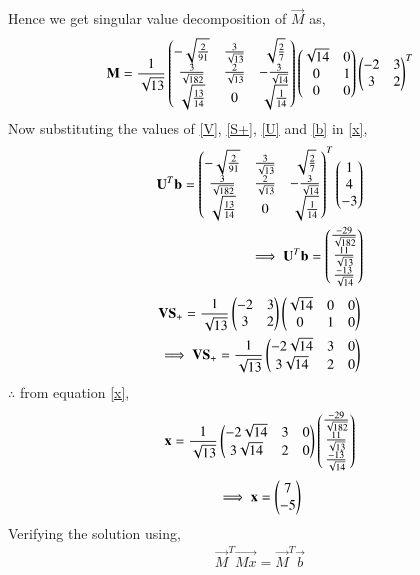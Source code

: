 \documentclass[journal,12pt,twocolumn]{IEEEtran}
\begin{document}
Hence we get singular value decomposition of $\vec{M}$ as,
\begin{align}
\mathbf{M} = \frac{1}{\sqrt{13}}\begin{pmatrix}-\sqrt{\frac{2}{91}} &\frac{3}{\sqrt{13}} & \sqrt{\frac{2}{7}}\\\frac{3}{\sqrt{182}} &\frac{2}{\sqrt{13}} &-\frac{3}{\sqrt{14}} \\\sqrt{\frac{13}{14}} &0 & \sqrt{\frac{1}{14}}\end{pmatrix}\begin{pmatrix}\sqrt{14}&0\\0&1\\0&0\end{pmatrix}\begin{pmatrix}-2&3\\3&2\end{pmatrix}^T
\end{align}
Now substituting the values of \eqref{V}, \eqref{S+}, \eqref{U} and \eqref{b} in \eqref{x},
\begin{align}
\mathbf{U}^T\mathbf{b} = \begin{pmatrix}-\sqrt{\frac{2}{91}} &\frac{3}{\sqrt{13}} & \sqrt{\frac{2}{7}}\\\frac{3}{\sqrt{182}} &\frac{2}{\sqrt{13}} &-\frac{3}{\sqrt{14}} \\\sqrt{\frac{13}{14}} &0 & \sqrt{\frac{1}{14}}\end{pmatrix}^T\begin{pmatrix}1\\4\\-3\end{pmatrix}\\
\implies \mathbf{U}^T\mathbf{b} = \begin{pmatrix}\frac{-29}{\sqrt{182}}\\\frac{11}{\sqrt{13}}\\\frac{-13}{\sqrt{14}}\end{pmatrix}\label{Utb}
\end{align}
\begin{align}
\mathbf{V}\mathbf{S}_+ = \frac{1}{\sqrt{13}}\begin{pmatrix}-2&3\\3&2\end{pmatrix}\begin{pmatrix}\sqrt{14}&0&0\\0&1&0\end{pmatrix}\\
\implies \mathbf{V}\mathbf{S}_+ =\frac{1}{\sqrt{13}}\begin{pmatrix}-2\sqrt{14}&3&0\\3\sqrt{14}&2&0\end{pmatrix}
\end{align}
$\therefore$ from equation \eqref{x},
\begin{align}
\mathbf{x} = \frac{1}{\sqrt{13}}\begin{pmatrix}-2\sqrt{14}&3&0\\3\sqrt{14}&2&0\end{pmatrix} \begin{pmatrix}\frac{-29}{\sqrt{182}}\\\frac{11}{\sqrt{13}}\\\frac{-13}{\sqrt{14}}\end{pmatrix}\label{fx}
\end{align} 
\begin{align}
\implies \mathbf{x} = \begin{pmatrix}7\\-5\end{pmatrix}
\end{align}
Verifying the solution using,
\begin{align}
\vec{M}^T\vec{Mx} = \vec{M}^T\vec{b}
\end{align}
\end{document}
